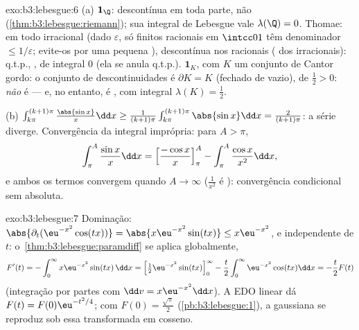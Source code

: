 \begin{solution}{exo:b3:lebesgue:6}
(a) $\mathbf 1_\Q$: descontínua em toda parte, não
 (\cref{thm:b3:lebesgue:riemann}); sua
integral de Lebesgue vale $\lambda(\Q) = 0$. Thomae:  em
todo irracional (dado $\varepsilon$, só finitos
racionais em $\intcc01$ têm denominador $\leq
1/\varepsilon$; evite-os por uma pequena ),
descontínua nos racionais ( dos irracionais): 
q.t.p., , de integral $0$ (ela se anula q.t.p.).
$\mathbf 1_K$, com $K$ um conjunto de Cantor gordo: o conjunto de descontinuidades é
$\partial K = K$ (fechado de  vazio), de 
$\frac12 > 0$: \emph{não} é  --- e, no entanto, é
, com integral $\lambda(K) = \frac12$.

(b) $\int_{k\pi}^{(k+1)\pi}\frac{\abs{\sin x}}x\dd x \geq
\frac1{(k+1)\pi}\int_{k\pi}^{(k+1)\pi}\abs{\sin x}\dd x =
\frac{2}{(k+1)\pi}$: a série diverge. Convergência da
integral imprópria: para $A > \pi$,
\[
\int_\pi^A\frac{\sin x}x\dd x = \Bigl[\frac{-\cos
x}x\Bigr]_\pi^A - \int_\pi^A\frac{\cos x}{x^2}\dd x,
\]
e ambos os termos convergem quando $A \to \infty$ ($\frac1{x^2}$ é
): convergência condicional sem 
absoluta.
\end{solution}

\begin{solution}{exo:b3:lebesgue:7}
Dominação: $\abs{\partial_t(\eu^{-x^2}\cos(tx))} =
\abs{x\eu^{-x^2}\sin(tx)} \leq x\eu^{-x^2}$,  e
independente de $t$: o~\cref{thm:b3:lebesgue:paramdiff} se aplica
globalmente,
\[
F'(t) = -\int_0^\infty x\eu^{-x^2}\sin(tx)\,\dd x
= \Bigl[\tfrac12\eu^{-x^2}\sin(tx)\Bigr]_0^\infty
- \frac t2\int_0^\infty\eu^{-x^2}\cos(tx)\dd x
= -\frac t2F(t)
\]
(integração por partes com $\dd v = x\eu^{-x^2}\dd x$). A
EDO linear dá $F(t) = F(0)\eu^{-t^2/4}$; com $F(0) =
\frac{\sqrt\pi}2$ (\cref{pb:b3:lebesgue:1}), a gaussiana
se reproduz sob essa transformada em cosseno.
\end{solution}

